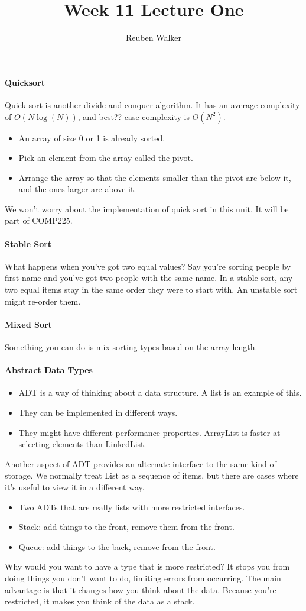 \documentclass[10pt,a4paper]{article}
\author{Reuben Walker}
\title{Week 11 Lecture One}
\begin{document}
\paragraph{Quicksort}
Quick sort is another divide and conquer algorithm. It has an average complexity of $O(N \log (N))$, and best?? case complexity is $O(N^2)$.
\begin{itemize}
\item An array of size 0 or 1 is already sorted.
\item Pick an element from the array called the pivot.
\item Arrange the array so that the elements smaller than the pivot are below it, and the ones larger are above it.
\end{itemize}
We won't worry about the implementation of quick sort in this unit. It will be part of COMP225.

\paragraph{Stable Sort}
What happens when you've got two equal values? Say you're sorting people by first name and you've got two people with the same name.
\linebreak
In a stable sort, any two equal items stay in the same order they were to start with. An unstable sort might re-order them.

\paragraph{Mixed Sort}
Something you can do is mix sorting types based on the array length.

\paragraph{Abstract Data Types}
\begin{itemize}
\item ADT is a way of thinking about a data structure. A list is an example of this.
\item They can be implemented in different ways.
\item They might have different performance properties. ArrayList is faster at selecting elements than LinkedList.
\end{itemize}
Another aspect of ADT provides an alternate interface to the same kind of storage. We normally treat List as a sequence of items, but there are cases where it's useful to view it in a different way.
\begin{itemize}
\item Two ADTs that are really lists with more restricted interfaces.
\item Stack: add things to the front, remove them from the front.
\item Queue: add things to the back, remove from the front.
\end{itemize}
Why would you want to have a type that is more restricted? It stops you from doing things you don't want to do, limiting errors from occurring.
\linebreak
The main advantage is that it changes how you think about the data. Because you're restricted, it makes you think of the data as a stack.
\end{document}
